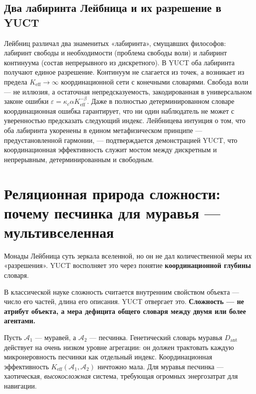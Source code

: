 \documentclass[12pt,a4paper]{article}
\begin{document}
	\subsection{Два лабиринта Лейбница и их разрешение в YUCT}
	
	Лейбниц различал два знаменитых «лабиринта», смущавших философов: лабиринт свободы и необходимости (проблема свободы воли) и лабиринт континуума (состав непрерывного из дискретного). В YUCT оба лабиринта получают единое разрешение. Континуум не слагается из точек, а возникает из предела \(K_{\mathrm{eff}} \to \infty\) координационной сети с конечными словарями. Свобода воли — не иллюзия, а остаточная непредсказуемость, закодированная в универсальном законе ошибки \(\varepsilon = \kappa_c \alpha K_{\mathrm{eff}}^{-\beta}\). Даже в полностью детерминированном словаре координационная ошибка гарантирует, что ни один наблюдатель не может с уверенностью предсказать следующий индекс. Лейбницева интуиция о том, что оба лабиринта укоренены в едином метафизическом принципе — предустановленной гармонии, — подтверждается демонстрацией YUCT, что координационная эффективность служит мостом между дискретным и непрерывным, детерминированным и свободным.
	

	
	\section{Реляционная природа сложности: почему песчинка для муравья — мультивселенная}
	\label{sec:relational-complexity}
	
	Монады Лейбница суть зеркала вселенной, но он не дал количественной меры их «разрешения». YUCT восполняет это через понятие \textbf{координационной глубины} словаря.
	
	В классической науке сложность считается внутренним свойством объекта — число его частей, длина его описания. YUCT отвергает это. \textbf{Сложность — не атрибут объекта, а мера дефицита общего словаря между двумя или более агентами.}
	
	Пусть \(\mathcal{A}_1\) — муравей, а \(\mathcal{A}_2\) — песчинка. Генетический словарь муравья \(D_{\text{ant}}\) действует на очень низком уровне агрегации: он должен трактовать каждую микронеровность песчинки как отдельный индекс. Координационная эффективность \(K_{\mathrm{eff}}(\mathcal{A}_1, \mathcal{A}_2)\) ничтожно мала. Для муравья песчинка — хаотическая, \emph{высокосложная} система, требующая огромных энергозатрат для навигации.
	
\end{document}
